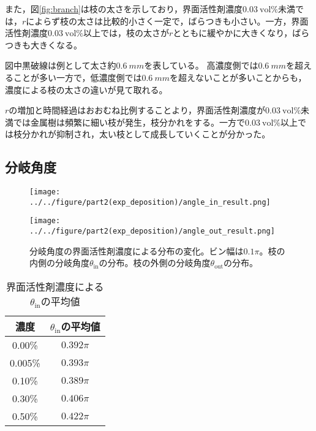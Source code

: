 \documentclass[autodetect-engine,dvi=dvipdfmx,a4paper,ja=standard,oneside,openany,11pt]{bxjsbook}
\begin{document}
また，図\ref{fig:branch}は枝の太さを示しており，界面活性剤濃度$\SI{0.03}{\mathrm{vol}\%}$未満では，$r$によらず枝の太さは比較的小さく一定で，ばらつきも小さい。一方，界面活性剤濃度$\SI{0.03}{\mathrm{vol}\%}$以上では，枝の太さが$r$とともに緩やかに大きくなり，ばらつきも大きくなる。

図中黒破線は例として太さ約$\SI{0.6}{mm}$を表している。
高濃度側では$\SI{0.6}{mm}$を超えることが多い一方で，低濃度側では$\SI{0.6}{mm}$を超えないことが多いことからも，濃度による枝の太さの違いが見て取れる。

$r$の増加と時間経過はおおむね比例することより，界面活性剤濃度が$\SI{0.03}{\mathrm{vol}\%}$未満では金属樹は頻繁に細い枝が発生，枝分かれをする。一方で$\SI{0.03}{\mathrm{vol}\%}$以上では枝分かれが抑制され，太い枝として成長していくことが分かった。

\subsection{分岐角度}

\begin{figure}[htbp]
  \begin{minipage}
    {0.5\textwidth}
    \subcaption{}
    \centering
    \texttt{[image: ../../figure/part2(exp\_deposition)/angle\_in\_result.png]}
    \label{fig:angle_in}
  \end{minipage}
  \begin{minipage}
    {0.45\textwidth}
    \subcaption{}
    \centering
    \texttt{[image: ../../figure/part2(exp\_deposition)/angle\_out\_result.png]}
    \label{fig:angle_out}
  \end{minipage}
  \caption{分岐角度の界面活性剤濃度による分布の変化。ビン幅は$0.1\pi$。枝の内側の分岐角度$\theta_{\mathrm{in}}$の分布。枝の外側の分岐角度$\theta_{\mathrm{out}}$の分布。}
  \label{fig:angle}
\end{figure}

\begin{table}
  \centering
  \caption{界面活性剤濃度による$\theta_{\mathrm{in}}$の平均値}
  \begin{tabular}{|c|c|}
    \hline
    濃度      & $\theta_{\mathrm{in}}$の平均値 \\
    \hline\hline
    0.00\%  & $0.392\pi$                 \\ \hline
    0.005\% & $0.393\pi$                 \\ \hline
    0.10\%  & $0.389\pi$                 \\ \hline
    0.30\%  & $0.406\pi$                 \\ \hline
    0.50\%  & $0.422\pi$                 \\
    \hline
  \end{tabular}
  \label{tab:angle_average}
\end{table}
\end{document}
